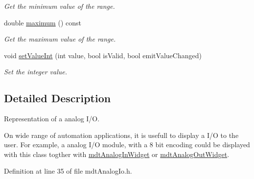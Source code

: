 \begin{DoxyCompactItemize}
\begin{DoxyCompactList}\small\item\em Get the minimum value of the range. \end{DoxyCompactList}\item 
\hypertarget{classmdt_analog_io_a61e312bc7921a6ca097ea6babf3281a5}{
double \hyperlink{classmdt_analog_io_a61e312bc7921a6ca097ea6babf3281a5}{maximum} () const }
\label{classmdt_analog_io_a61e312bc7921a6ca097ea6babf3281a5}

\begin{DoxyCompactList}\small\item\em Get the maximum value of the range. \end{DoxyCompactList}\item 
void \hyperlink{classmdt_analog_io_a2b1fb3fd25580c4e470f1962f7640750}{setValueInt} (int value, bool isValid, bool emitValueChanged)
\begin{DoxyCompactList}\small\item\em Set the integer value. \end{DoxyCompactList}\end{DoxyCompactItemize}


\subsection{Detailed Description}
Representation of a analog I/O. 

On wide range of automation applications, it is usefull to display a I/O to the user. For example, a analog I/O module, with a 8 bit encoding could be displayed with this class togther with \hyperlink{classmdt_analog_in_widget}{mdtAnalogInWidget} or \hyperlink{classmdt_analog_out_widget}{mdtAnalogOutWidget}. 

Definition at line 35 of file mdtAnalogIo.h.




